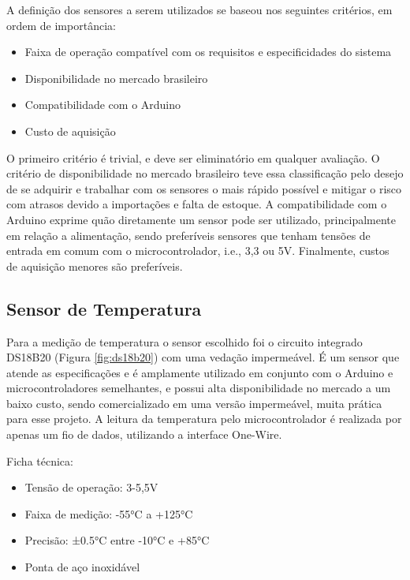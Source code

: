 A definição dos sensores a serem utilizados se baseou nos seguintes critérios, em ordem de importância:

\begin{itemize}
    \item Faixa de operação compatível com os requisitos e especificidades do sistema
    \item Disponibilidade no mercado brasileiro
    \item Compatibilidade com o Arduino
    \item Custo de aquisição
\end{itemize}

O primeiro critério é trivial, e deve ser eliminatório em qualquer avaliação. O critério de disponibilidade no mercado brasileiro teve essa classificação pelo desejo de se adquirir e trabalhar com os sensores o mais rápido possível e mitigar o risco com atrasos devido a importações e falta de estoque. A compatibilidade com o Arduino exprime quão diretamente um sensor pode ser utilizado, principalmente em relação a alimentação, sendo preferíveis sensores que tenham tensões de entrada em comum com o microcontrolador, i.e., 3,3 ou 5V. Finalmente, custos de aquisição menores são preferíveis.

\subsection{Sensor de Temperatura}

Para a medição de temperatura o sensor escolhido foi o circuito integrado DS18B20 (Figura \ref{fig:ds18b20}) com uma vedação impermeável. É um sensor que atende as especificações e é amplamente utilizado em conjunto com o Arduino e microcontroladores semelhantes, e possui alta disponibilidade no mercado a um baixo custo, sendo comercializado em uma versão impermeável, muita prática para esse projeto. A leitura da temperatura pelo microcontrolador é realizada por apenas um fio de dados, utilizando a interface One-Wire. 

Ficha técnica:
\begin{itemize}
    \item Tensão de operação: 3-5,5V
    \item Faixa de medição: -55°C a +125°C
    \item Precisão: ±0.5°C entre -10°C e +85°C
    \item Ponta de aço inoxidável
\end{itemize}

